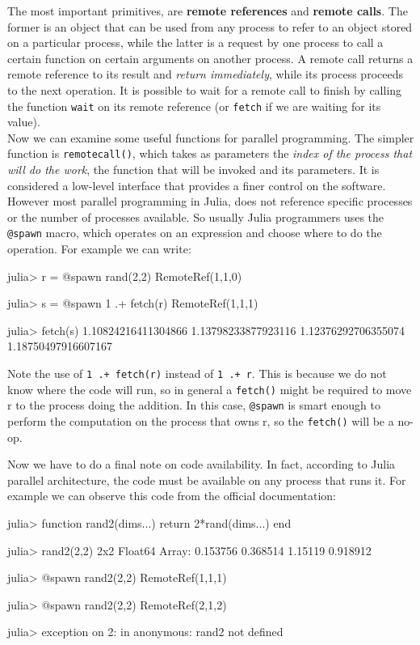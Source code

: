 The most important primitives, are \textbf{remote references} and \textbf{remote calls}. The former is an object that can be used from any process to refer to an object stored on a particular process, while the latter is a request by one process to call a certain function on certain arguments on another process. A remote call returns a remote reference to its result and \textit{return immediately}, while its process proceeds to the next operation. It is possible to wait for a remote call to finish by calling the function \texttt{wait} on its remote reference (or \texttt{fetch} if we are waiting for its value).\\

Now we can examine some useful functions for parallel programming. The simpler function is \texttt{remotecall()}, which takes as parameters the \textit{index of the process that will do the work}, the function that will be invoked and its parameters. It is considered a low-level interface that provides a finer control on the software. However most parallel programming in Julia, does not reference specific processes or the number of processes available. So usually Julia programmers uses the \texttt{@spawn} macro, which operates on an expression and choose where to do the operation. For example we can write:
\begin{julia}
 julia> r = @spawn rand(2,2)
 RemoteRef(1,1,0)

 julia> s = @spawn 1 .+ fetch(r)
 RemoteRef(1,1,1)

 julia> fetch(s)
 1.10824216411304866 1.13798233877923116
 1.12376292706355074 1.18750497916607167
\end{julia}
Note the use of \texttt{1 .+ fetch(r)} instead of \texttt{1 .+ r}. This is because we do not know where the code will run, so in general a \texttt{fetch()} might be required to move r to the process doing the addition. In this case, \texttt{@spawn} is smart enough to perform the computation on the process that owns r, so the \texttt{fetch()} will be a no-op.

Now we have to do a final note on code availability. In fact, according to Julia parallel architecture, the code must be available on any process that runs it. For example we can observe this code from the official documentation:
\begin{julia}
 julia> function rand2(dims...)
          return 2*rand(dims...)
        end

 julia> rand2(2,2)
 2x2 Float64 Array:
  0.153756  0.368514
  1.15119   0.918912

 julia> @spawn rand2(2,2)
 RemoteRef(1,1,1)

 julia> @spawn rand2(2,2)
 RemoteRef(2,1,2)

 julia> exception on 2: in anonymous: rand2 not defined
\end{julia}

